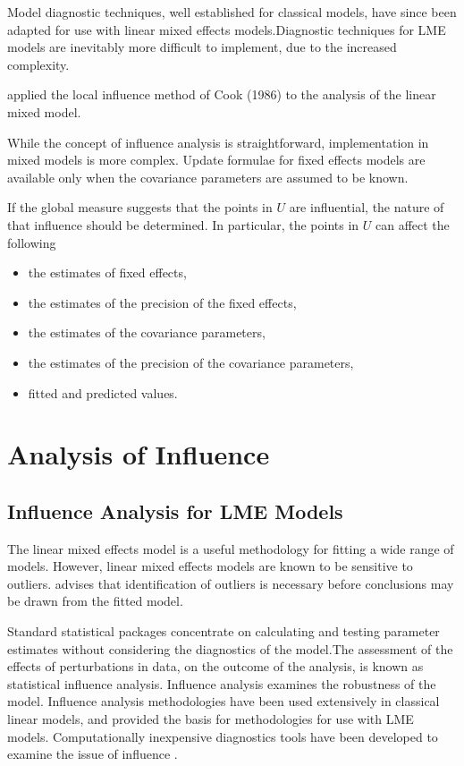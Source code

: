 \documentclass[12pt, a4paper]{article}
\begin{document}
Model diagnostic techniques, well established for classical models, have since been adapted for use with linear mixed effects models.Diagnostic techniques for LME models are inevitably more difficult to implement, due to the increased complexity.


\citet{Beckman} applied the local influence method of Cook (1986) to the analysis of the linear mixed model.


While the concept of influence analysis is straightforward, implementation in mixed models is more complex. Update formulae for fixed effects models are available only when the covariance parameters are assumed to be known.


If the global measure suggests that the points in $U$ are influential, the nature of that influence should be determined. In particular, the points in $U$ can affect the following


\begin{itemize}
	\item the estimates of fixed effects,
	\item the estimates of the precision of the fixed effects,
	\item the estimates of the covariance parameters,
	\item the estimates of the precision of the covariance parameters,
	\item fitted and predicted values.
\end{itemize}



\section{Analysis of  Influence}

\subsection{Influence Analysis for LME Models} %
The linear mixed effects model is a useful methodology for fitting a wide range of models. However, linear mixed effects models are known to be sensitive to outliers. \citet{CPJ} advises that identification of outliers is necessary before conclusions may be drawn from the fitted model.

Standard statistical packages concentrate on calculating and testing parameter estimates without considering the diagnostics of the model.The assessment of the effects of perturbations in data, on the outcome of the analysis, is known as statistical influence analysis. Influence analysis examines the robustness of the model. Influence analysis methodologies have been used extensively in classical linear models, and provided the basis for methodologies for use with LME models.
Computationally inexpensive diagnostics tools have been developed to examine the issue of influence \citep{Zewotir}.
\end{document}
